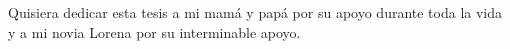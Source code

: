 
\begin{dedication} %

Quisiera dedicar esta tesis a mi mamá y papá por su apoyo durante toda la vida y a mi novia Lorena por su interminable apoyo.

\end{dedication}



